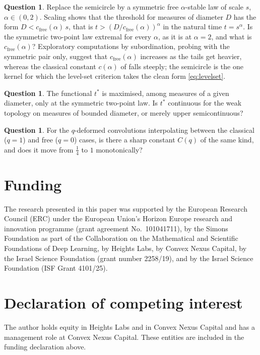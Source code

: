 \documentclass[11pt]{amsart}
\theoremstyle{definition}
\newtheorem{question}[theorem]{Question}
\begin{document}
\begin{question}
Replace the semicircle by a symmetric free $\alpha$-stable law of scale $s$, $\alpha\in(0,2)$. Scaling shows that the threshold for measures of diameter $D$ has the form $D<c_{\mathrm{free}}(\alpha)\,s$, that is $t>(D/c_{\mathrm{free}}(\alpha))^\alpha$ in the natural time $t=s^\alpha$. Is the symmetric two-point law extremal for every $\alpha$, as it is at $\alpha=2$, and what is $c_{\mathrm{free}}(\alpha)$? Exploratory computations by subordination, probing with the symmetric pair only, suggest that $c_{\mathrm{free}}(\alpha)$ increases as the tails get heavier, whereas the classical constant $c(\alpha)$ of  falls steeply; the semicircle is the one kernel for which the level-set criterion takes the clean form \eqref{eq:levelset}.
\end{question}

\begin{question}
The functional $t^*$ is maximised, among measures of a given diameter, only at the symmetric two-point law. Is $t^*$ continuous for the weak topology on measures of bounded diameter, or merely upper semicontinuous?
\end{question}

\begin{question}
For the $q$-deformed convolutions interpolating between the classical ($q=1$) and free ($q=0$) cases, is there a sharp constant $C(q)$ of the same kind, and does it move from $\frac14$ to $1$ monotonically?
\end{question}

\section*{Funding}
The research presented in this paper was supported by the European Research Council (ERC) under the European Union's Horizon Europe research and innovation programme (grant agreement No.~101041711), by the Simons Foundation as part of the Collaboration on the Mathematical and Scientific Foundations of Deep Learning, by Heights Labs, by Convex Nexus Capital, by the Israel Science Foundation (grant number 2258/19), and by the Israel Science Foundation (ISF Grant 4101/25).

\section*{Declaration of competing interest}
The author holds equity in Heights Labs and in Convex Nexus Capital and has a management role at Convex Nexus Capital. These entities are included in the funding declaration above.
\end{document}
